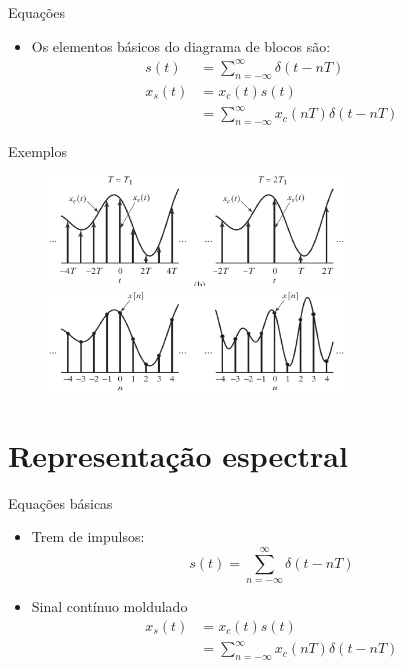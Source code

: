 \begin{slide}{Equações}
\begin{itemize}
   \item Os elementos básicos do diagrama de blocos são:
   \begin{align}
      s(t) &= \sum_{n=-\infty}^{\infty}\delta(t-nT)\\
      x_s(t) &= x_c(t)s(t) \\ &= \sum_{n=-\infty}^{\infty}x_c(nT)\delta(t-nT)
   \end{align}
\end{itemize}
\end{slide}

\begin{slide}{Exemplos}
   \begin{figure}
      \centering
      \includegraphics[width=0.7\textwidth]{figs/representacao1.eps}
      \includegraphics[width=0.7\textwidth]{figs/representacao2.eps}
   \end{figure}
\end{slide}

\section{Representação espectral}
\begin{slide}{Equações básicas}
\begin{itemize}
   \item Trem de impulsos:
   \begin{equation}
      s(t) = \sum_{n=-\infty}^{\infty}\delta(t-nT)
   \end{equation}
   \item Sinal cont\'inuo moldulado
   \begin{align}
      x_s(t) &= x_c(t)s(t)\\
             &= \sum_{n=-\infty}^{\infty}x_c(nT)\delta(t-nT)
   \end{align}
\end{itemize}
\end{slide}

